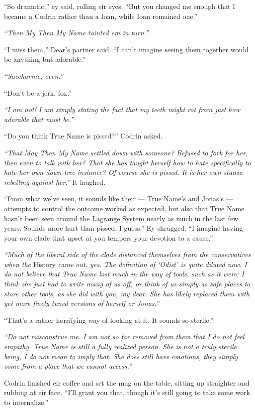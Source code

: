 ``So dramatic,'' ey said, rolling eir eyes. ``But you changed me enough that I became a Codrin rather than a Ioan, while Ioan remained one.''

\emph{``Then My Then My Name tainted em in turn.''}

``I miss them,'' Dear's partner said. ``I can't imagine seeing them together would be anything but adorable.''

\emph{``Saccharine, even.''}

``Don't be a jerk, fox.''

\emph{``I am not! I am simply stating the fact that my teeth might rot from just how adorable that must be.''}

``Do you think True Name is pissed?'' Codrin asked.

\emph{``That May Then My Name settled down with someone? Refused to fork for her, then even to talk with her? That she has taught herself how to hate specifically to hate her own down-tree instance? Of course she is pissed. It is her own stanza rebelling against her.''} It laughed.

``From what we've seen, it sounds like their — True Name's and Jonas's — attempts to control the outcome worked as expected, but also that True Name hasn't been seen around the Lagrange System nearly as much in the last few years. Sounds more hurt than pissed, I guess.'' Ey shrugged. ``I imagine having your own clade that upset at you tempers your devotion to a cause.''

\emph{``Much of the liberal side of the clade distanced themselves from the conservatives when the} History \emph{came out, yes. The definition of `Odist' is quite diluted now. I do not believe that True Name lost much in the way of tools, such as it were; I think she just had to write many of us off, or think of us simply as safe places to store other tools, as she did with you, my dear. She has likely replaced them with yet more finely tuned versions of herself or Jonas.''}

``That's a rather horrifying way of looking at it. It sounds so sterile.''

\emph{``Do not misconstrue me. I am not so far removed from them that I do not feel empathy. True Name is still a fully realized person. She is not a truly sterile being, I do not mean to imply that. She does still have emotions, they simply come from a place that we cannot access.''}

Codrin finished eir coffee and set the mug on the table, sitting up straighter and rubbing at eir face. ``I'll grant you that, though it's still going to take some work to internalize.''

